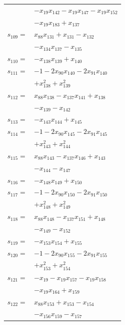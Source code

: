 \begin{longtable}{@{}r@{\;}l@{}}
 & \(\displaystyle -x_{19}x_{142} -x_{19}x_{147} -x_{19}x_{152}\) \\
 & \(\displaystyle -x_{19}x_{183} +x_{137}\) \\[3pt]
\(s_{109}=\) & \(\displaystyle x_{88}x_{131} +x_{131} -x_{132}\) \\
 & \(\displaystyle -x_{134}x_{137} -x_{135}\) \\[3pt]
\(s_{110}=\) & \(\displaystyle -x_{138}x_{139} +x_{140}\) \\[3pt]
\(s_{111}=\) & \(\displaystyle -1 -2x_{90}x_{140} -2x_{91}x_{140}\) \\
 & \(\displaystyle +x_{138}^{2} +x_{139}^{2}\) \\[3pt]
\(s_{112}=\) & \(\displaystyle x_{88}x_{138} -x_{137}x_{141} +x_{138}\) \\
 & \(\displaystyle -x_{139} -x_{142}\) \\[3pt]
\(s_{113}=\) & \(\displaystyle -x_{143}x_{144} +x_{145}\) \\[3pt]
\(s_{114}=\) & \(\displaystyle -1 -2x_{90}x_{145} -2x_{91}x_{145}\) \\
 & \(\displaystyle +x_{143}^{2} +x_{144}^{2}\) \\[3pt]
\(s_{115}=\) & \(\displaystyle x_{88}x_{143} -x_{137}x_{146} +x_{143}\) \\
 & \(\displaystyle -x_{144} -x_{147}\) \\[3pt]
\(s_{116}=\) & \(\displaystyle -x_{148}x_{149} +x_{150}\) \\[3pt]
\(s_{117}=\) & \(\displaystyle -1 -2x_{90}x_{150} -2x_{91}x_{150}\) \\
 & \(\displaystyle +x_{148}^{2} +x_{149}^{2}\) \\[3pt]
\(s_{118}=\) & \(\displaystyle x_{88}x_{148} -x_{137}x_{151} +x_{148}\) \\
 & \(\displaystyle -x_{149} -x_{152}\) \\[3pt]
\(s_{119}=\) & \(\displaystyle -x_{153}x_{154} +x_{155}\) \\[3pt]
\(s_{120}=\) & \(\displaystyle -1 -2x_{90}x_{155} -2x_{91}x_{155}\) \\
 & \(\displaystyle +x_{153}^{2} +x_{154}^{2}\) \\[3pt]
\(s_{121}=\) & \(\displaystyle -x_{19} -x_{19}x_{157} -x_{19}x_{158}\) \\
 & \(\displaystyle -x_{19}x_{164} +x_{159}\) \\[3pt]
\(s_{122}=\) & \(\displaystyle x_{88}x_{153} +x_{153} -x_{154}\) \\
 & \(\displaystyle -x_{156}x_{159} -x_{157}\) \\[3pt]

\end{longtable}
